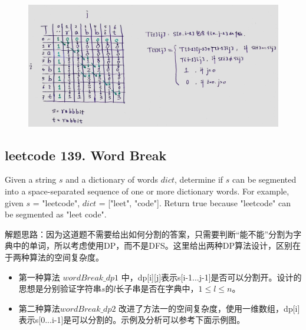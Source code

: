 \documentclass[a4paper,10pt]{article}
\begin{document}
\begin{figure}[h]
\includegraphics[width=\textwidth]{leetcode115.jpg}
\centering\\
\end{figure}


\subsection{leetcode 139. Word Break}
Given a string $s$ and a dictionary of words $dict$, determine if $s$ can be segmented into a space-separated sequence of one or more dictionary words. For example, given $s$ = "leetcode", $dict$ = ["leet", "code"]. Return true because "leetcode" can be segmented as "leet code". \\

\begin{CJK*}{UTF8}{gbsn}
\noindent 解题思路：因为这道题不需要给出如何分割的答案，只需要判断“能不能”分割为字典中的单词，所以考虑使用DP，而不是DFS。这里给出两种DP算法设计，区别在于两种算法的空间复杂度。
\begin{itemize}
    \item 第一种算法 $wordBreak\_dp1$ 中，dp[i][j]表示s[i-1...j-1]是否可以分割开。设计的思想是分别验证字符串$s$的$l$长子串是否在字典中，$1 \leq l \leq n$。
    
    \item 第二种算法$wordBreak\_dp2$ 改进了方法一的空间复杂度，使用一维数组，dp[i]表示s[0...i-1]是可以分割的。示例及分析可以参考下面示例图。
\end{itemize}
\end{CJK*}
\end{document}
